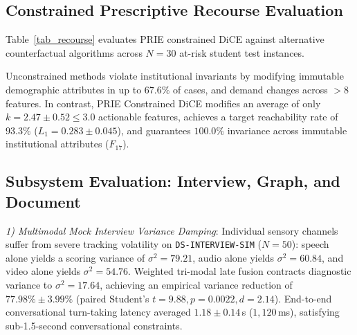 \documentclass[conference]{IEEEtran}
\begin{document}
\subsection{Constrained Prescriptive Recourse Evaluation}
Table~\ref{tab_recourse} evaluates PRIE constrained DiCE against alternative counterfactual algorithms across $N=30$ at-risk student test instances.

\begin{table}[htbp]
\caption{Counterfactual Recourse Optimization Benchmark ($N=30$)}
\label{tab_recourse}
\centering
{}
\end{table}

Unconstrained methods violate institutional invariants by modifying immutable demographic attributes in up to $67.6\%$ of cases, and demand changes across $>8$ features. In contrast, PRIE Constrained DiCE modifies an average of only $k = 2.47 \pm 0.52 \le 3.0$ actionable features, achieves a target reachability rate of $93.3\%$ ($L_1 = 0.283 \pm 0.045$), and guarantees $100.0\%$ invariance across immutable institutional attributes ($F_{17}$).

\subsection{Subsystem Evaluation: Interview, Graph, and Document}
\textit{1) Multimodal Mock Interview Variance Damping}: Individual sensory channels suffer from severe tracking volatility on \texttt{DS-INTERVIEW-SIM} ($N=50$): speech alone yields a scoring variance of $\sigma^2 = 79.21$, audio alone yields $\sigma^2 = 60.84$, and video alone yields $\sigma^2 = 54.76$. Weighted tri-modal late fusion contracts diagnostic variance to $\sigma^2 = 17.64$, achieving an empirical variance reduction of $77.98\% \pm 3.99\%$ (paired Student's $t = 9.88, p = 0.0022, d = 2.14$). End-to-end conversational turn-taking latency averaged $1.18 \pm 0.14$\,s ($1,120$\,ms), satisfying sub-1.5-second conversational constraints.
\end{document}
